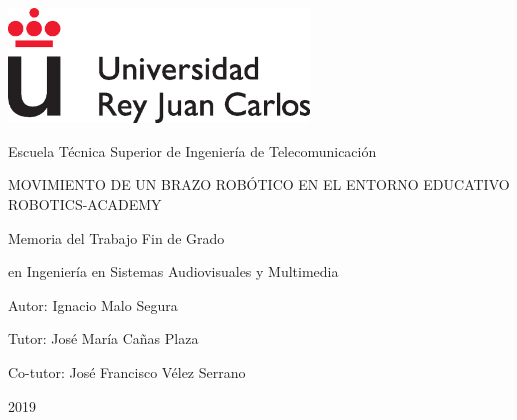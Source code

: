 \documentclass[12pt,spanish,chapterprefix, numbers=noenddot]{book}
\numberwithin{equation}{section}
\numberwithin{figure}{section}
\begin{document}
\frontmatter

\begin{titlepage}

\begin{center}
\includegraphics[width=8cm]{Figs/logoURJC}
\par\end{center}

\begin{center}
Escuela Técnica Superior de Ingeniería de Telecomunicación
\par\end{center}

\vspace{4cm}

\begin{center}
{\LARGE{}MOVIMIENTO DE UN BRAZO ROBÓTICO 
EN EL ENTORNO EDUCATIVO ROBOTICS-ACADEMY}{\LARGE\par}
\par\end{center}

\vspace{4cm}

\begin{center}
{\large{}Memoria del Trabajo Fin de Grado}{\large\par}
\par\end{center}

\begin{center}
{\large{}en Ingeniería en Sistemas Audiovisuales y Multimedia}{\large\par}
\par\end{center}

\vspace{4cm}

\begin{center}
{\large{}Autor: Ignacio Malo Segura}{\large\par}
\par\end{center}

\begin{center}
{\large{}Tutor: José María Cañas Plaza}{\large\par}
\par\end{center}

\begin{center}
{\large{}Co-tutor: José Francisco Vélez Serrano}{\large\par}
\par\end{center}

\begin{center}
2019
\par\end{center}

\end{titlepage}
\end{document}
